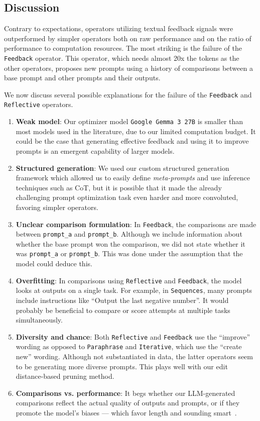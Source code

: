 \subsection{Discussion}

Contrary to expectations, operators utilizing textual feedback signals were outperformed by simpler operators
both on raw performance and on the ratio of performance to computation resources.
The most striking is the failure of the \texttt{Feedback} operator. This operator, which needs almost 20x the tokens as the other operators,
proposes new prompts using a history of comparisons between a base prompt and other prompts and their outputs. 

We now discuss several possible explanations for the failure of the \texttt{Feedback} and \texttt{Reflective} operators.
\begin{enumerate}
    \item \textbf{Weak model}: Our optimizer model \texttt{Google Gemma 3 27B} is smaller than most models used in the literature, due to our limited computation budget. It could be the case that generating effective feedback and using it to improve prompts is an emergent capability of larger models.
    \item \textbf{Structured generation}: We used our custom structured generation framework which allowed us to easily define \textit{meta-prompts} and use inference techniques such as CoT, but it is possible that it made the already challenging prompt optimization task even harder and more convoluted, favoring simpler operators.
    \item \textbf{Unclear comparison formulation}: In \texttt{Feedback}, the comparisons are made between \texttt{prompt\_a} and \texttt{prompt\_b}. Although we include information about whether the base prompt won the comparison, we did not state whether it was \texttt{prompt\_a} or \texttt{prompt\_b}. This was done under the assumption that the model could deduce this.
    \item \textbf{Overfitting}: In comparisons using \texttt{Reflective} and \texttt{Feedback}, the model looks at outputs on a single task. For example, in \texttt{Sequences}, many prompts include instructions like ``Output the last negative number''. It would probably be beneficial to compare or score attempts at multiple tasks simultaneously.
    \item \textbf{Diversity and chance}: Both \texttt{Reflective} and \texttt{Feedback} use the ``improve'' wording as opposed to \texttt{Paraphrase} and \texttt{Iterative}, which use the ``create new'' wording. Although not substantiated in data, the latter operators seem to be generating more diverse prompts. This plays well with our edit distance-based pruning method.
    \item \textbf{Comparisons vs. performance}: It begs whether our LLM-generated comparisons reflect the actual quality of outputs and prompts, or if they promote the model's biases — which favor length and sounding smart~\cite{ye2024justiceprejudicequantifyingbiases}.
\end{enumerate}

